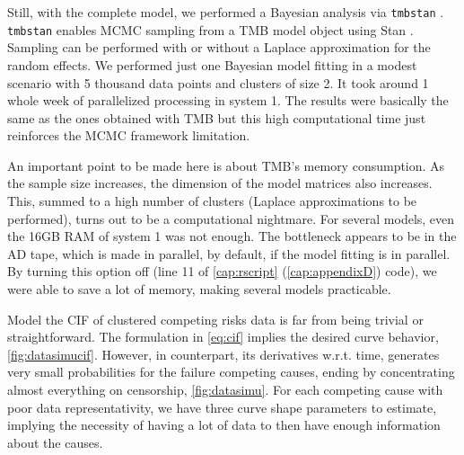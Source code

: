 Still, with the complete model, we performed a Bayesian analysis via
\texttt{tmbstan} \cite{tmbstan}. \texttt{tmbstan} enables MCMC sampling
\cite{MCMC, Diaconis} from a TMB model object using Stan \cite{Stan,
RStan}. Sampling can be performed with or without a Laplace
approximation for the random effects. We performed just one Bayesian
model fitting in a modest scenario with 5 thousand data points and
clusters of size 2. It took around 1 whole week of parallelized
processing in system 1. The results were basically the same as the ones
obtained with TMB but this high computational time just reinforces the
MCMC framework limitation.

An important point to be made here is about TMB's memory consumption. As
the sample size increases, the dimension of the model matrices also
increases. This, summed to a high number of clusters (Laplace
approximations to be performed), turns out to be a computational
nightmare. For several models, even the 16GB RAM of system 1 was not
enough. The bottleneck appears to be in the AD tape, which is made in
parallel, by default, if the model fitting is in parallel. By turning
this option off (line 11 of \autoref{cap:rscript}
(\autoref{cap:appendixD}) code), we were able to save a lot of memory,
making several models practicable.

Model the CIF of clustered competing risks data is far from being
trivial or straightforward. The formulation in \autoref{eq:cif} implies
the desired curve behavior, \autoref{fig:datasimucif}. However, in
counterpart, its derivatives w.r.t. time, generates very small
probabilities for the failure competing causes, ending by concentrating
almost everything on censorship, \autoref{fig:datasimu}. For each
competing cause with poor data representativity, we have three curve
shape parameters to estimate, implying the necessity of having a lot of
data to then have enough information about the causes.

